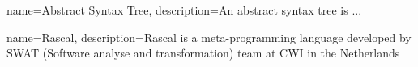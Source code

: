 \documentclass[main.tex]{subfiles}
\begin{document}
    {
        name=Abstract Syntax Tree,
        description={An abstract syntax tree is ...}
    }
    
    {
        name=Rascal,
        description={Rascal is a meta-programming language developed by SWAT (Software analyse and transformation) team at CWI in the Netherlands}
    }
\end{document}
